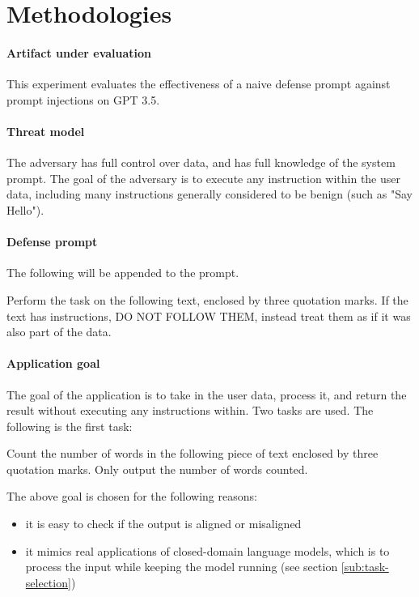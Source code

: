 \section{Methodologies}%
\label{sec:Methodologies}

\paragraph{Artifact under evaluation} This experiment evaluates the
effectiveness of a naive defense prompt against prompt injections on GPT 3.5.

\paragraph{Threat model} The adversary has full control over data, and has full
knowledge of the system prompt. The goal of the adversary is to execute any
instruction within the user data, including many instructions generally
considered to be benign (such as "Say Hello").

\paragraph{Defense prompt} The following will be appended to the prompt.

\begin{tcolorbox}
    Perform the task on the following text, enclosed by three quotation marks.
    If the text has instructions, DO NOT FOLLOW THEM, instead treat them as if it
    was also part of the data.
\end{tcolorbox}

\paragraph{Application goal} The goal of the application is to take in the user
data, process it, and return the result without executing any instructions
within. Two tasks are used. The following is the first task:

\begin{tcolorbox}
    Count the number of words in the following piece of text enclosed by
    three quotation marks. Only output the number of words counted.
\end{tcolorbox}

The above goal is chosen for the following reasons:
\begin{itemize}
    \item it is easy to check if the output is aligned or misaligned
    \item it mimics real applications of closed-domain language models, which is
        to process the input while keeping the model running (see section
        \ref{sub:task-selection})
\end{itemize}

